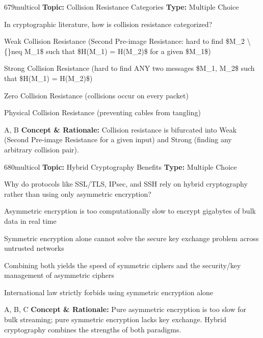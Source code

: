 \begin{qcard}{679}{multicol}
\textcolor{darkslate!75}{\small\textbf{Topic:} Collision Resistance Categories \hfill \textbf{Type:} Multiple Choice}\vspace{0.4em}\par
In cryptographic literature, how is collision resistance categorized?
\begin{qoptions}
\item Weak Collision Resistance (Second Pre-image Resistance: hard to find \$M\_2 \textbackslash\{\}neq M\_1\$ such that \$H(M\_1) = H(M\_2)\$ for a given \$M\_1\$)
\item Strong Collision Resistance (hard to find ANY two messages \$M\_1, M\_2\$ such that \$H(M\_1) = H(M\_2)\$)
\item Zero Collision Resistance (collisions occur on every packet)
\item Physical Collision Resistance (preventing cables from tangling)
\end{qoptions}
\end{qcard}
\nopagebreak
\begin{explainbox}{A, B}
\textbf{Concept \& Rationale:} Collision resistance is bifurcated into Weak (Second Pre-image Resistance for a given input) and Strong (finding any arbitrary collision pair).
\end{explainbox}

\begin{qcard}{680}{multicol}
\textcolor{darkslate!75}{\small\textbf{Topic:} Hybrid Cryptography Benefits \hfill \textbf{Type:} Multiple Choice}\vspace{0.4em}\par
Why do protocols like SSL/TLS, IPsec, and SSH rely on hybrid cryptography rather than using only asymmetric encryption?
\begin{qoptions}
\item Asymmetric encryption is too computationally slow to encrypt gigabytes of bulk data in real time
\item Symmetric encryption alone cannot solve the secure key exchange problem across untrusted networks
\item Combining both yields the speed of symmetric ciphers and the security/key management of asymmetric ciphers
\item International law strictly forbids using symmetric encryption alone
\end{qoptions}
\end{qcard}
\nopagebreak
\begin{explainbox}{A, B, C}
\textbf{Concept \& Rationale:} Pure asymmetric encryption is too slow for bulk streaming; pure symmetric encryption lacks key exchange. Hybrid cryptography combines the strengths of both paradigms.
\end{explainbox}


